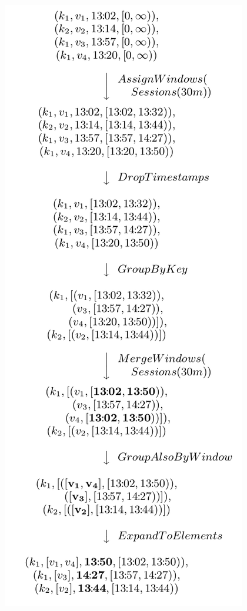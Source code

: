 \documentclass[oneside]{ctexbook}
\begin{document}
\noindent \includegraphics[width=\textwidth]{windowmerging.png}
\end{document}
